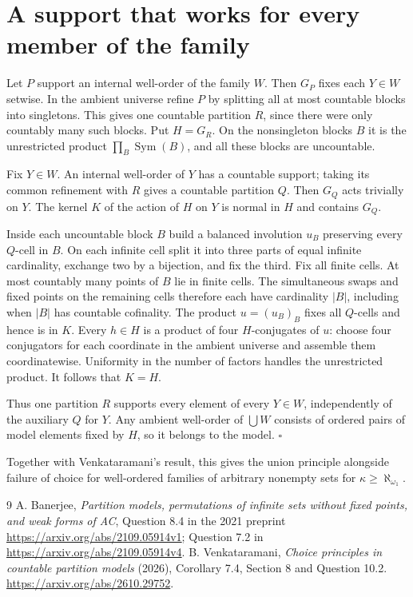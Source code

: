 \documentclass[11pt]{article}
\begin{document}
\section*{A support that works for every member of the family}
Let $P$ support an internal well-order of the family $W$. Then $G_P$ fixes each $Y\in W$ setwise. In the ambient universe refine $P$ by splitting all at most countable blocks into singletons. This gives one countable partition $R$, since there were only countably many such blocks. Put $H=G_R$. On the nonsingleton blocks $B$ it is the unrestricted product $\prod_B\operatorname{Sym}(B)$, and all these blocks are uncountable.

Fix $Y\in W$. An internal well-order of $Y$ has a countable support; taking its common refinement with $R$ gives a countable partition $Q$. Then $G_Q$ acts trivially on $Y$. The kernel $K$ of the action of $H$ on $Y$ is normal in $H$ and contains $G_Q$.

Inside each uncountable block $B$ build a balanced involution $u_B$ preserving every $Q$-cell in $B$. On each infinite cell split it into three parts of equal infinite cardinality, exchange two by a bijection, and fix the third. Fix all finite cells. At most countably many points of $B$ lie in finite cells. The simultaneous swaps and fixed points on the remaining cells therefore each have cardinality $|B|$, including when $|B|$ has countable cofinality. The product $u=(u_B)_B$ fixes all $Q$-cells and hence is in $K$. Every $h\in H$ is a product of four $H$-conjugates of $u$: choose four conjugators for each coordinate in the ambient universe and assemble them coordinatewise. Uniformity in the number of factors handles the unrestricted product. It follows that $K=H$.

Thus one partition $R$ supports every element of every $Y\in W$, independently of the auxiliary $Q$ for $Y$. Any ambient well-order of $\bigcup W$ consists of ordered pairs of model elements fixed by $H$, so it belongs to the model. \hfill$\square$

Together with Venkataramani's result, this gives the union principle alongside failure of choice for well-ordered families of arbitrary nonempty sets for $\kappa\ge\aleph_{\omega_1}$.
\begin{thebibliography}{9}
 A. Banerjee, \emph{Partition models, permutations of infinite sets without fixed points, and weak forms of AC}, Question 8.4 in the 2021 preprint \url{https://arxiv.org/abs/2109.05914v1}; Question 7.2 in \url{https://arxiv.org/abs/2109.05914v4}.
 B. Venkataramani, \emph{Choice principles in countable partition models} (2026), Corollary 7.4, Section 8 and Question 10.2. \url{https://arxiv.org/abs/2610.29752}.
\end{thebibliography}
\end{document}
